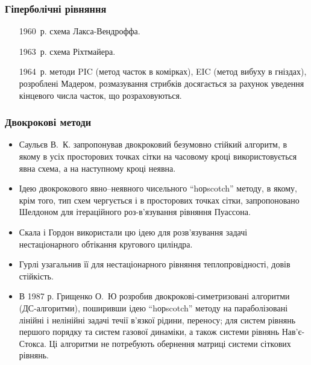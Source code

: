 \subsubsection{Гіперболічні рівняння}

\begin{itemize}
    \item[1960~р.] схема Лакса-Вендроффа.
    \item[1963~р.] схема Ріхтмайера.
    \item[1964~р.] методи PIC (метод часток в комірках), EIC (метод вибуху в гніздах), розроблені  Мадером, розмазування стрибків досягається за рахунок уведення кінцевого числа часток, що розраховуються. 
\end{itemize}

\subsubsection{Двокрокові методи}

\begin{itemize}
    \item Саульєв В.~К. запропонував двокроковий безумовно стійкий алгоритм, в якому в усіх просторових точках сітки на часовому кроці використовується явна схема, а на наступному кроці неявна. 
    \item Ідею двокрокового явно–неявного чисельного ``hорscotch'' методу, в якому, крім того, тип схем чергується і в просторових точках сітки, запропоновано Шелдоном для ітераційного роз-в'язування рівняння Пуассона. 
    \item Скала і Гордон  використали цю ідею для розв'язування задачі нестаціонарного обтікання кругового циліндра.
    \item Гурлі узагальнив її для нестаціонарного рівняння теплопровідності, довів стійкість. 
    \item В 1987 р. Грищенко О.~Ю розробив двокрокові-симетризовані алгоритми (ДС-алгоритми), поширивши ідею ``hорscotch'' методу на параболізовані лінійні і нелінійні задачі течії в'язкої рідини, переносу; для систем рівнянь першого порядку та систем газової динаміки, а також системи рівнянь Нав'є-Стокса. Ці алгоритми не потребують обернення матриці системи сіткових рівнянь.
\end{itemize}

